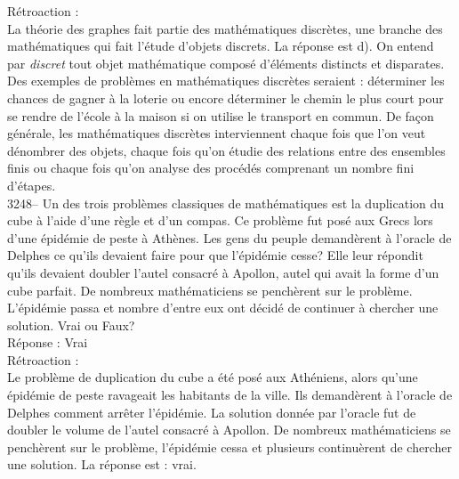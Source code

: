 \documentclass[letterpaper, 12pt]{article}
\begin{document}
R\'etroaction :\\
La th\'eorie des graphes fait partie des math\'ematiques discr\`etes, une branche des math\'ematiques qui fait l'\'etude d'objets discrets. La r\'eponse est d). On entend par \emph{discret} tout objet math\'ematique compos\'e d'\'el\'ements distincts et disparates. Des exemples de probl\`emes en math\'ematiques discr\`etes seraient : d\'eterminer les chances de gagner \`a la loterie ou encore d\'eterminer le chemin le plus court pour se rendre de l'\'ecole \`a la maison si on utilise le transport en commun. De fa\c con g\'en\'erale, les math\'ematiques discr\`etes interviennent chaque fois que l'on veut d\'enombrer des objets, chaque fois qu'on \'etudie des relations entre des ensembles finis ou chaque fois qu'on analyse des proc\'ed\'es comprenant un nombre fini d'\'etapes.\\



3248-- Un des trois probl\`emes classiques de math\'ematiques est la duplication du cube \`a l'aide d'une r\`egle et d'un compas. Ce probl\`eme fut pos\'e aux Grecs lors d'une \'epid\'emie de peste \`a Ath\`enes. Les gens du peuple demand\`erent \`a l'oracle de Delphes ce qu'ils devaient faire pour que l'\'epid\'emie cesse? Elle leur r\'epondit qu'ils devaient doubler l'autel consacr\'e \`a Apollon, autel qui avait la forme d'un cube parfait. De nombreux math\'ematiciens se pench\`erent sur le probl\`eme. L'\'epid\'emie passa et nombre d'entre eux ont d\'ecid\'e de continuer \`a chercher une solution. Vrai ou Faux?\\

R\'eponse : Vrai\\

R\'etroaction :\\
Le probl\`eme de duplication du cube a \'et\'e pos\'e aux Ath\'eniens, alors qu'une \'epid\'emie de peste ravageait les habitants de la ville. Ils demand\`erent \`a l'oracle de Delphes comment arr\^eter l'\'epid\'emie. La solution donn\'ee par l'oracle fut de doubler le volume de l'autel consacr\'e \`a Apollon. De nombreux math\'ematiciens se pench\`erent sur le probl\`eme, l'\'epid\'emie cessa et plusieurs continu\`erent de chercher une solution. La r\'eponse est : vrai.\\
\end{document}
